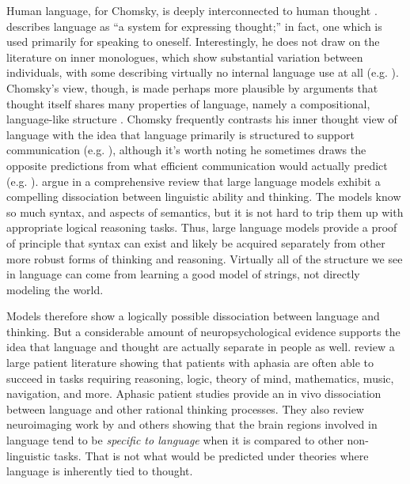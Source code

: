 \documentclass[output=paper,colorlinks,citecolor=brown
]{langscibook}
\begin{document}
Human language, for Chomsky, is deeply interconnected to human thought \citep{everaert2015structures}. \citet{chomsky2002nature} describes language as ``a system for expressing thought;'' in fact, one which is used primarily for speaking to oneself. Interestingly, he does not draw on the literature on inner monologues, which show substantial variation between individuals, with some describing virtually no internal language use at all (e.g. \citealt{reed1916existence,heavey2008phenomena,roebuck2020internal}). Chomsky's view, though, is made perhaps more plausible by arguments that thought itself shares many properties of language, namely a compositional, language-like structure \citep{fodor1975language,fodor1988connectionism,goodman2014concepts,piantadosi2016four,quilty2022best}. Chomsky frequently contrasts his inner thought view of language with the idea that language primarily is structured to support communication (e.g. \citealt{hockett1959animal,bates1982functionalist,gibson2019efficiency}), although it's worth noting he sometimes draws the opposite predictions from what efficient communication would actually predict (e.g. \citealt{piantadosi2012communicative}). \citet{mahowald2023dissociating} argue in a comprehensive review that large language models exhibit a compelling dissociation between linguistic ability and thinking. The models know so much syntax, and aspects of semantics, but it is not hard to trip them up with appropriate logical reasoning tasks. Thus, large language models provide a proof of principle that syntax can exist and likely be acquired separately from other more robust forms of thinking and reasoning. Virtually all of the structure we see in language can come from learning a good model of strings, not directly modeling the world. 

Models therefore show a logically possible dissociation between language and thinking. But a considerable amount of neuropsychological evidence supports the idea that language and thought are actually separate in people as well. \citet{fedorenko2016language} review a large patient literature showing that patients with aphasia are often able to succeed in tasks requiring reasoning, logic, theory of mind, mathematics, music, navigation, and more. Aphasic patient studies provide an in vivo dissociation between language and other rational thinking processes. They also review neuroimaging work by \citet{fedorenko2011functional} and others showing that the brain regions involved in language tend to be \textit{specific to language} when it is compared to other non-linguistic tasks. That is not what would be predicted under theories where language is inherently tied to thought. 
\end{document}
